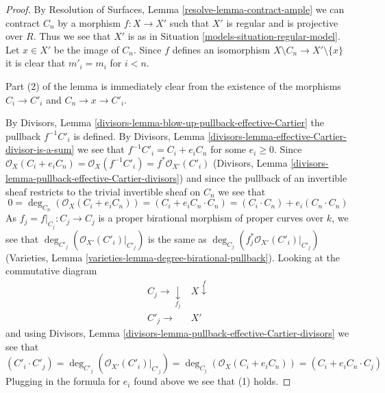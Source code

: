 \begin{proof}

By Resolution of Surfaces, Lemma \ref{resolve-lemma-contract-ample}
we can contract $C_n$ by a morphism $f : X \to X'$ such that $X'$ is
regular and is projective over $R$. Thus we see that $X'$ is as in
Situation \ref{models-situation-regular-model}.
Let $x \in X'$ be the image of $C_n$.
Since $f$ defines an isomorphism $X \setminus C_n \to X' \setminus \{x\}$
it is clear that $m'_i = m_i$ for $i < n$.

\medskip\noindent
Part (2) of the lemma is immediately clear from
the existence of the morphisms $C_i \to C'_i$ and $C_n \to x \to C'_i$.

\medskip\noindent
By Divisors, Lemma \ref{divisors-lemma-blow-up-pullback-effective-Cartier}
the pullback $f^{-1}C'_i$ is defined. By
Divisors, Lemma \ref{divisors-lemma-effective-Cartier-divisor-is-a-sum}
we see that $f^{-1}C'_i = C_i + e_i C_n$ for some $e_i \geq 0$. Since
$\mathcal{O}_X(C_i + e_i C_n) = \mathcal{O}_X(f^{-1}C'_i) =
f^*\mathcal{O}_{X'}(C'_i)$
(Divisors, Lemma \ref{divisors-lemma-pullback-effective-Cartier-divisors})
and since the pullback of an invertible sheaf restricts to the
trivial invertible sheaf on $C_n$ we see that
$$
0 = \deg_{C_n}(\mathcal{O}_X(C_i + e_i C_n)) =
(C_i + e_i C_n \cdot C_n) = (C_i \cdot C_n) + e_i(C_n \cdot C_n)
$$
As $f_j = f|_{C_j} : C_j \to C_j$ is a
proper birational morphism of proper curves
over $k$, we see that $\deg_{C'_j}(\mathcal{O}_{X'}(C'_i)|_{C'_j})$ is the
same as $\deg_{C_j}(f_j^*\mathcal{O}_{X'}(C'_i)|_{C'_j})$
(Varieties, Lemma \ref{varieties-lemma-degree-birational-pullback}).
Looking at the commutative diagram
$$
\begin{array}{cc}C_j \longrightarrow\underset{f_j}{\downarrow} & X \overset{f}{\downarrow} \\ C'_j \longrightarrow & X'\end{array}
$$
and using Divisors, Lemma
\ref{divisors-lemma-pullback-effective-Cartier-divisors}
we see that
$$
(C'_i \cdot C'_j) = \deg_{C'_j}(\mathcal{O}_{X'}(C'_i)|_{C'_j}) =
\deg_{C_j}(\mathcal{O}_X(C_i + e_i C_n)) = (C_i + e_i C_n \cdot C_j)
$$
Plugging in the formula for $e_i$ found above we see that (1) holds.
\end{proof}

